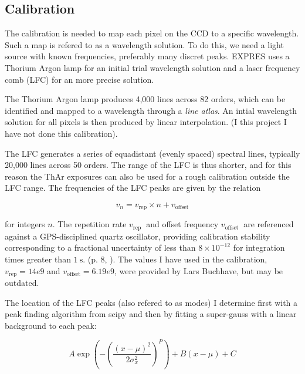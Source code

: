 \subsection{Calibration} 


    The calibration is needed to map each pixel on the CCD to a specific wavelength. Such a map is refered to as a wavelength solution. To do this, we need a light source with known frequencies, preferably many discret peaks. EXPRES uses a Thorium Argon lamp for an initial trial wavelength solution and a laser frequency comb (LFC) for an more precise solution.
    
    The Thorium Argon lamp produces 4,000 lines across 82 orders, which can be identified and mapped to a wavelength through a \emph{line atlas}. An intial wavelength solution for all pixels is then produced by linear interpolation. (I this project I have not done this calibration).

    The LFC generates a series of equadistant (evenly spaced) spectral lines, typically 20,000 lines across 50 orders. The range of the LFC is thus shorter, and for this reason the ThAr exposures can also be used for a rough calibration outside the LFC range. The frequencies of the LFC peaks are given by the relation
    
    \begin{equation}
        \label{eq:LFC_freq_eq}
        v_{n}=v_{\text{rep}} \times n+v_{\text{offset}}
    \end{equation}

    for integers $n$. The repetition rate $v_{\text {rep }}$ and offset frequency $v_{\text {offset }}$ are referenced against a GPS-disciplined quartz oscillator, providing calibration stability corresponding to a fractional uncertainty of less than $8 \times 10^{-12}$ for integration times greater than $1 \mathrm{~s}$. (p. 8, \cite{first_RV_from_EXPRES}). The values I have used in the calibration, $v_{\text{rep}} = 14e9$ and $v_{\text{offset}} = 6.19e9$, were provided by Lars Buchhave, but may be outdated. 

    The location of the LFC peaks (also refered to as modes) I determine first with a peak finding algorithm from scipy and then by fitting a super-gauss with a linear background to each peak:
    
    \begin{equation}
        \label{eq:LFC_super_gauss}
        A \exp \left(-\left(\frac{\left(x-\mu\right)^{2}}{2 \sigma_{x}^{2}}\right)^{P}\right) + B(x-\mu) + C
    \end{equation}
    
